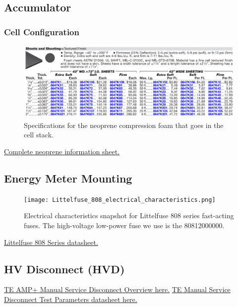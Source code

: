 \documentclass{article}
\begin{document}
\subsection{Accumulator}\label{appendix_accumulator}

\subsubsection{Cell Configuration}\label{appendix_accumulator_cell_configuration}

\begin{figure} [!ht]
	\centering  %
	\includegraphics[width=\textwidth]{Cell_neoprene_stats.png}
	\caption{Specifications for the neoprene compression foam that goes in the cell stack.}	
	\label{fig:cell_neoprene_stats}
\end{figure}
\href{http://www.kvc.com.my/StorageAttachment/Kvcsb/datasheet/898/mcmaster-8694K154.pdf}{Complete neoprene information sheet.}


\subsection{Energy Meter Mounting}\label{appendix_energy_meter_mounting}

\begin{figure} [!ht]
	\centering  %
	\texttt{[image: Littelfuse\_808\_electrical\_characteristics.png]}
	\caption{Electrical characteristics snapshot for Littelfuse 808 series fast-acting fuses. The high-voltage low-power fuse we use is the 80812000000.}	
	\label{fig:littelfuse_808}
\end{figure}

\href{http://www.littelfuse.com/~/media/c635bf51279f4ef6bedee5deb356e102.ashx}{Littelfuse 808 Series datasheet.}

\subsection{HV Disconnect (HVD)}\label{appendix_hvd}
\href{http://www.te.com/content/dam/te-com/documents/hybrid-and-electric-mobility-solutions/global/8-1773462-2-msd.pdf}{TE AMP+ Manual Service Disconnect Overview here.}
\href{http://www.te.com/commerce/DocumentDelivery/DDEController?Action=showdoc&DocId=Specification+Or+Standard%7F108-127000%7FA%7Fpdf%7FEnglish%7FENG_SS_108-127000_A.pdf%7FN-A}{TE Manual Service Disconnect Test Parameters datasheet here.}
\end{document}
